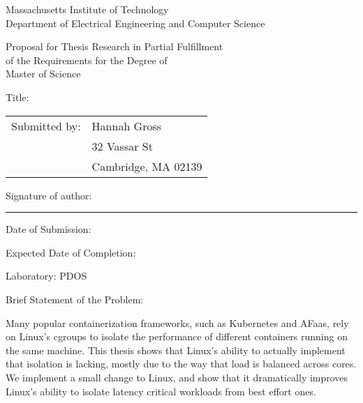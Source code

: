 
\begingroup
{}\large\selectfont


\begin{center}
Massachusetts Institute of Technology \\
Department of Electrical Engineering and Computer Science
\end{center}

\begin{center}
Proposal for Thesis Research in Partial Fulfillment \\
of the Requirements for the Degree of \\
Master of Science
\end{center}

\vspace{1em}
\noindent Title: \mytitle

\vspace{1em}
\noindent\begin{tabular}{@{}ll}
Submitted by: & Hannah Gross\\
              & 32 Vassar St \\
              & Cambridge, MA 02139
\end{tabular}

\vspace{1em}
\noindent Signature of author: \rule{5cm}{0.1pt}

\vspace{1em}
\noindent Date of Submission: \mydate

\vspace{1em}
\noindent Expected Date of Completion: \mycompletion

\vspace{1em}
\noindent Laboratory: PDOS

\vspace{1em}
\noindent Brief Statement of the Problem:

\vspace{1em}
\begin{minipage}{\dimexpr\textwidth-1cm}

\noindent Many popular containerization frameworks, such as Kubernetes and
AFaas, rely on Linux's cgroups to isolate the performance of different
containers running on the same machine. This thesis shows that Linux's ability
to actually implement that isolation is lacking, mostly due to the way that load
is balanced across cores. We implement a small change to Linux, and show that it
dramatically improves Linux's ability to isolate latency critical workloads from
best effort ones.

\end{minipage}

